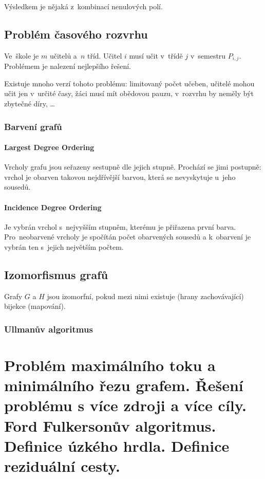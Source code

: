 Výsledkem je nějaká z~kombinací nenulových polí.

\subsection{Problém časového rozvrhu}

Ve~škole je $m$ učitelů a~$n$ tříd.
Učitel $i$ musí učit v~třídě $j$ v~semestru $P_{i,j}$.
Problémem je nalezení nejlepšího řešení.

Existuje mnoho verzí tohoto problému:
limitovaný počet učeben,
učitelé mohou učit jen v~určité časy,
žáci musí mít obědovou pauzu,
v~rozvrhu by neměly být zbytečné díry,
\dots

\subsubsection{Barvení grafů}

\paragraph{Largest Degree Ordering}

Vrcholy grafu jsou seřazeny sestupně dle jejich stupně.
Prochází se jimi postupně: vrchol je obarven takovou nejdřívější barvou, která se nevyskytuje u~jeho sousedů.

\paragraph{Incidence Degree Ordering}

Je vybrán vrchol s~nejvyšším stupněm, kterému je přiřazena první barva.
Pro~neobarvené vrcholy je spočítán počet obarvených sousedů a k~obarvení je vybrán ten s~jejich největším počtem.

\subsection{Izomorfismus grafů}

Grafy $G$ a $H$ jsou izomorfní, pokud mezi nimi existuje (hrany zachovávající) bijekce (mapování).

\subsubsection{Ullmanův algoritmus}

\clearpage
\section{Problém maximálního toku a minimálního řezu grafem. Řešení problému s více zdroji a více cíly. Ford Fulkersonův algoritmus. Definice úzkého hrdla. Definice reziduální cesty.}


